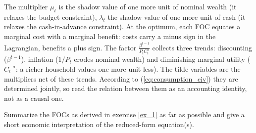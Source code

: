 \documentclass[a4paper, 12pt]{article}
\begin{document}
\begin{Answer}
	The multiplier $\mu_t$ is the shadow value of one more unit of nominal wealth (it relaxes the budget constraint), $\lambda_t$ the shadow value of one more unit of cash (it relaxes the cash-in-advance constraint). At the optimum, each FOC equates a marginal cost with a marginal benefit: costs carry a minus sign in the Lagrangian, benefits a plus sign. The factor $\frac{\beta^{t-1}}{P_tC_t^\sigma}$ collects three trends: discounting ($\beta^{t-1}$), inflation ($1/P_t$ erodes nominal wealth) and diminishing marginal utility ($C_t^{-\sigma}$: a richer household values one more unit less). The tilde variables are the multipliers net of these trends. According to (\ref{eq:consumption_civ}) they are determined jointly, so read the relation between them as an accounting identity, not as a causal one.%
\end{Answer}%
\bigskip%
\begin{Exercise}[title={Change-in-variables and economic intuition},label=ex_2]%
	Summarize the FOCs as derived in exercise \ref{ex_1} as far as possible and give a short economic interpretation of the reduced-form equation(s).%
\end{Exercise}%
\bigskip%
\end{document}
